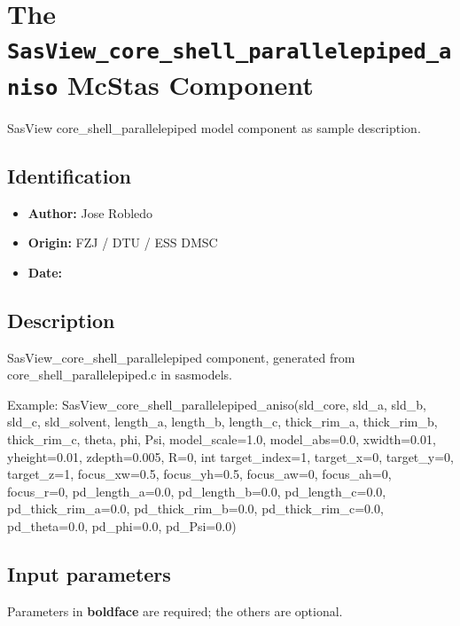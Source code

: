 \section{The \texttt{SasView\_core\_shell\_parallelepiped\_aniso} McStas Component}
SasView core\_shell\_parallelepiped model component as sample description.

\subsection*{Identification}
\begin{itemize}
  \item \textbf{Author:} Jose Robledo
  \item \textbf{Origin:} FZJ / DTU / ESS DMSC
  \item \textbf{Date:} 
\end{itemize}

\subsection*{Description}
SasView\_core\_shell\_parallelepiped component, generated from core\_shell\_parallelepiped.c in sasmodels.

Example: SasView\_core\_shell\_parallelepiped\_aniso(sld\_core, sld\_a, sld\_b, sld\_c, sld\_solvent, length\_a, length\_b, length\_c, thick\_rim\_a, thick\_rim\_b, thick\_rim\_c, theta, phi, Psi, model\_scale=1.0, model\_abs=0.0, xwidth=0.01, yheight=0.01, zdepth=0.005, R=0, int target\_index=1, target\_x=0, target\_y=0, target\_z=1, focus\_xw=0.5, focus\_yh=0.5, focus\_aw=0, focus\_ah=0, focus\_r=0, pd\_length\_a=0.0, pd\_length\_b=0.0, pd\_length\_c=0.0, pd\_thick\_rim\_a=0.0, pd\_thick\_rim\_b=0.0, pd\_thick\_rim\_c=0.0, pd\_theta=0.0, pd\_phi=0.0, pd\_Psi=0.0)

\subsection*{Input parameters}
Parameters in \textbf{boldface} are required; the others are optional.

